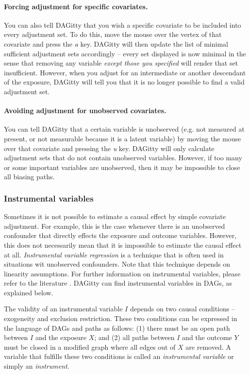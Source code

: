\documentclass[a4paper]{article} %
\newcommand{\pp}{{\sc DAG}itty\xspace}
\begin{document}
\paragraph{Forcing adjustment for specific covariates.}

You can also tell \pp that you wish a specific covariate
to be included into every adjustment set. To do this, move the
mouse over the vertex of that covariate and press the \emph{a} 
key. \pp will then update the list of minimal sufficient
adjustment sets accordingly -- every set displayed
is now minimal in the sense that removing any variable 
\emph{except those you specified} will render
that set insufficient. However, when you adjust for an intermediate
or another descendant of the exposure, \pp will tell you that it is no longer
possible to find a valid adjustment set.

\paragraph{Avoiding adjustment for unobserved covariates.}

You can tell \pp that a certain variable is unobserved 
(e.g. not measured at present, or not measurable because it is a 
latent variable) by moving the mouse 
over that covariate and pressing the \emph{u} key.
\pp will only calculate adjustment sets that do 
not contain unobserved variables. However, if too many or
some important variables are unobserved, then it may
be impossible to close all biasing paths. 

\subsubsection{Instrumental variables}

Sometimes it is not possible to estimate a causal effect by simple covariate adjustment.
For example, this is the case whenever there is an unobserved confounder that directly
effects the exposure and outcome variables. However, this does not necessarily 
mean that it is impossible to estimate the causal effect at all. 
\emph{Instrumental variable regression} is a technique that is 
often used in situations wit unobserved confounders.
Note that this technique depends on linearity assumptions. For further information
on instrumental variables, please refer to the literature \cite{AngristIR96,imbens14}. 
\pp can find instrumental variables in DAGs, as explained below. 

The validity of an instrumental variable $I$ depends on two causal conditions -- 
exogeneity and exclusion restriction. These two conditions can be expressed 
in the language of DAGs and paths as follows: (1) there must be an open path between 
$I$ and the exposure $X$; and (2) all paths between $I$ and the outcome $Y$ must be
closed in a modified graph where all edges out of $X$ are removed. 
A variable that fulfills these two conditions is called an \emph{instrumental variable}
or simply an \emph{instrument}.
\end{document}
